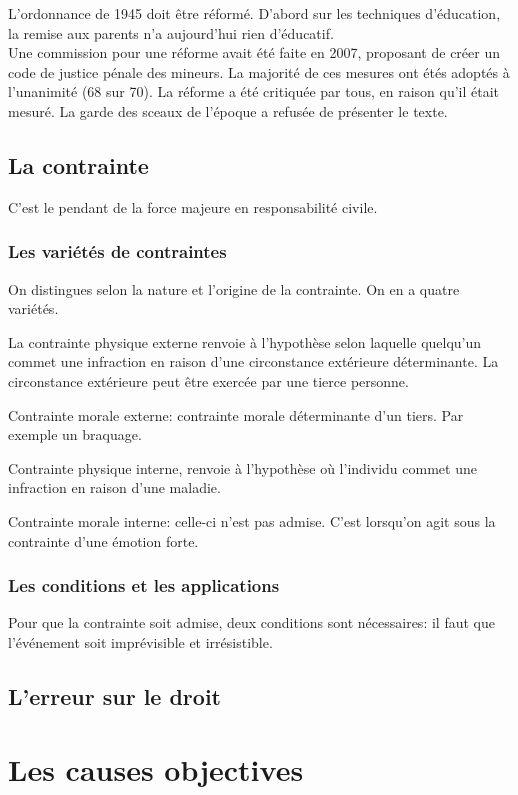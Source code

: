 \documentclass[10pt, a4paper, openany]{book}
\begin{document}
L'ordonnance de 1945 doit être réformé. D'abord sur les techniques d'éducation, la remise aux parents n'a aujourd'hui rien d'éducatif. \\
Une commission pour une réforme avait été faite en 2007, proposant de créer un code de justice pénale des mineurs. La majorité de ces mesures ont étés adoptés à l'unanimité (68 sur 70). La réforme a été critiquée par tous, en raison qu'il était mesuré. La garde des sceaux de l'époque a refusée de présenter le texte. 

\subsection{La contrainte}

C'est le pendant de la force majeure en responsabilité civile. 

\subsubsection{Les variétés de contraintes}

On distingues selon la nature et l'origine de la contrainte. On en a quatre variétés.


La contrainte physique externe renvoie à l'hypothèse selon laquelle quelqu'un commet une infraction en raison d'une circonstance extérieure déterminante. La circonstance extérieure peut être exercée par une tierce personne. 


Contrainte morale externe: contrainte morale déterminante d'un tiers. Par exemple un braquage.


Contrainte physique interne, renvoie à l'hypothèse où l'individu commet une infraction en raison d'une maladie. 


Contrainte morale interne: celle-ci n'est pas admise. C'est lorsqu'on agit sous la contrainte d'une émotion forte. 

\subsubsection{Les conditions et les applications}

Pour que la contrainte soit admise, deux conditions sont nécessaires: il faut que l'événement soit imprévisible et irrésistible. 





\subsection{L'erreur sur le droit}




\section{Les causes objectives}
\end{document}
